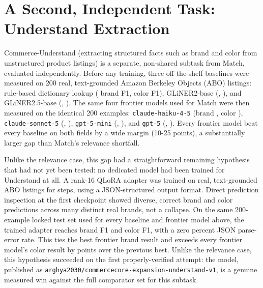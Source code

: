 \documentclass{article}
\newcommand{\code}[1]{\texttt{#1}}
\begin{document}
\section{A Second, Independent Task: Understand Extraction}
\label{sec:understand}
Commerce-Understand (extracting structured facts such as brand and color from unstructured product listings) is a separate, non-shared subtask from Match, evaluated independently. Before any training, three off-the-shelf baselines were measured on 200 real, text-grounded Amazon Berkeley Objects (ABO) listings: rule-based dictionary lookup (\RulesBrandFOne{} brand F1, \RulesColorFOne{} color F1), GLiNER2-base (\GlinerTwoBrandFOne{}, \GlinerTwoColorFOne{}), and GLiNER2.5-base (\GlinerTwoFiveBrandFOne{}, \GlinerTwoFiveColorFOne{}). The same four frontier models used for Match were then measured on the identical 200 examples: \code{claude-haiku-4-5} (brand \UnderstandHaikuBrandFOne{}, color \UnderstandHaikuColorFOne{}), \code{claude-sonnet-5} (\UnderstandSonnetBrandFOne{}, \UnderstandSonnetColorFOne{}), \code{gpt-5-mini} (\UnderstandGptMiniBrandFOne{}, \UnderstandGptMiniColorFOne{}), and \code{gpt-5} (\UnderstandGptBrandFOne{}, \UnderstandGptColorFOne{}). Every frontier model beat every baseline on both fields by a wide margin (10-25 points), a substantially larger gap than Match's relevance shortfall.

Unlike the relevance case, this gap had a straightforward remaining hypothesis that had not yet been tested: no dedicated model had been trained for Understand at all. A rank-16 QLoRA adapter was trained on \UnderstandTrainRows{} real, text-grounded ABO listings for \UnderstandTrainSteps{} steps, using a JSON-structured output format. Direct prediction inspection at the first checkpoint showed diverse, correct brand and color predictions across many distinct real brands, not a collapse. On the same 200-example locked test set used for every baseline and frontier model above, the trained adapter reaches \UnderstandAdapterBrandFOne{} brand F1 and \UnderstandAdapterColorFOne{} color F1, with a zero percent JSON parse-error rate. This ties the best frontier brand result and exceeds every frontier model's color result by \UnderstandColorMarginVsBestFrontier{} points over the previous best. Unlike the relevance case, this hypothesis succeeded on the first properly-verified attempt: the model, published as \code{arghya2030/commercecore-expansion-understand-v1}, is a genuine measured win against the full comparator set for this subtask.
\end{document}
